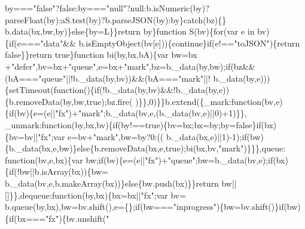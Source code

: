 \begin{DoxyCode}
      by===\textcolor{stringliteral}{"false"}?\textcolor{keyword}{false}:by===\textcolor{stringliteral}{"null"}?null:b.isNumeric(by)?parseFloat(by):aS.test(by)?b.parseJSON(by):by\}catch(bz)\{\}
      b.data(bx,bw,by)\}\textcolor{keywordflow}{else}\{by=L\}\}\textcolor{keywordflow}{return} by\}\textcolor{keyword}{function} S(bv)\{\textcolor{keywordflow}{for}(var e in bv)\{\textcolor{keywordflow}{if}(e===\textcolor{stringliteral}{"data"}&&
      b.isEmptyObject(bv[e]))\{\textcolor{keywordflow}{continue}\}\textcolor{keywordflow}{if}(e!==\textcolor{stringliteral}{"toJSON"})\{\textcolor{keywordflow}{return} \textcolor{keyword}{false}\}\}\textcolor{keywordflow}{return} \textcolor{keyword}{true}\}\textcolor{keyword}{function} bi(by,bx,bA)\{var bw=bx
      +\textcolor{stringliteral}{"defer"},bv=bx+\textcolor{stringliteral}{"queue"},e=bx+\textcolor{stringliteral}{"mark"},bz=b.\_data(by,bw);\textcolor{keywordflow}{if}(bz&&(bA===\textcolor{stringliteral}{"queue"}||!b.\_data(by,bv))&&(bA===\textcolor{stringliteral}{"mark"}||!
      b.\_data(by,e)))\{setTimeout(\textcolor{keyword}{function}()\{\textcolor{keywordflow}{if}(!b.\_data(by,bv)&&!b.\_data(by,e))\{b.removeData(by,bw,\textcolor{keyword}{true});bz.fire(
      )\}\},0)\}\}b.extend(\{\_mark:\textcolor{keyword}{function}(bv,e)\{\textcolor{keywordflow}{if}(bv)\{e=(e||\textcolor{stringliteral}{"fx"})+\textcolor{stringliteral}{"mark"};b.\_data(bv,e,(b.\_data(bv,e)||0)+1)\}\},
      \_unmark:\textcolor{keyword}{function}(by,bx,bv)\{\textcolor{keywordflow}{if}(by!==\textcolor{keyword}{true})\{bv=bx;bx=by;by=\textcolor{keyword}{false}\}\textcolor{keywordflow}{if}(bx)\{bv=bv||\textcolor{stringliteral}{"fx"};var e=bv+\textcolor{stringliteral}{"mark"},bw=by?0:((
      b.\_data(bx,e)||1)-1);\textcolor{keywordflow}{if}(bw)\{b.\_data(bx,e,bw)\}\textcolor{keywordflow}{else}\{b.removeData(bx,e,\textcolor{keyword}{true});bi(bx,bv,\textcolor{stringliteral}{"mark"})\}\}\},queue:\textcolor{keyword}{
      function}(bv,e,bx)\{var bw;\textcolor{keywordflow}{if}(bv)\{e=(e||\textcolor{stringliteral}{"fx"})+\textcolor{stringliteral}{"queue"};bw=b.\_data(bv,e);\textcolor{keywordflow}{if}(bx)\{\textcolor{keywordflow}{if}(!bw||b.isArray(bx))\{bw=
      b.\_data(bv,e,b.makeArray(bx))\}\textcolor{keywordflow}{else}\{bw.push(bx)\}\}\textcolor{keywordflow}{return} bw||[]\}\},dequeue:\textcolor{keyword}{function}(by,bx)\{bx=bx||\textcolor{stringliteral}{"fx"};var bv=
      b.queue(by,bx),bw=bv.shift(),e=\{\};\textcolor{keywordflow}{if}(bw===\textcolor{stringliteral}{"inprogress"})\{bw=bv.shift()\}\textcolor{keywordflow}{if}(bw)\{\textcolor{keywordflow}{if}(bx===\textcolor{stringliteral}{"fx"})\{bv.unshift(\textcolor{stringliteral}{"
}
\end{DoxyCode}
